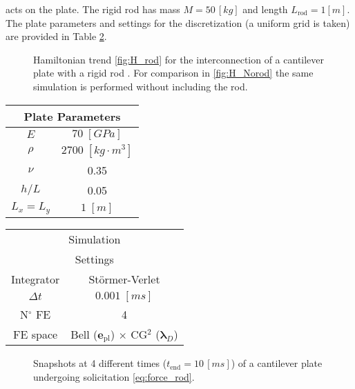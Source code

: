 \documentclass[letterpaper, 10 pt, conference]{ieeeconf}
\begin{document}
acts on the plate. The rigid rod has mass $M = 50 \, [kg]$ and length $L_{\text{rod}} = 1 [m]$. The plate parameters and settings for the discretization (a uniform grid is taken) are provided in Table \ref{tab:par}. 
\begin{figure}[t]
\centering
{}
\hfil
{}
\caption{Hamiltonian trend \ref{fig:H_rod} for the interconnection of a cantilever plate with a rigid rod . For comparison in \ref{fig:H_Norod} the same simulation is performed without including the rod.}
\label{fig:HamInt}
\end{figure}
\begin{table}[t]
	\centering
	\begin{tabular}{|c|c|}
		\hline 
		\multicolumn{2}{|c|}{Plate Parameters} \\ 
		\hline 
		$E$ & $70\; [GPa]$ \\ 
		$\rho$ & $2700\; [kg \cdot m^3]$ \\ 
		$\nu$& 0.35 \\ 
		$h/L$& 0.05 \\ 
		$L_x = L_y$& $1\; [m]$\\ 
		\hline 
	\end{tabular} 
	\begin{tabular}{|c|c|}
		\hline 
		\multicolumn{2}{|c|}{Simulation} \\ 
		\multicolumn{2}{|c|}{Settings} \\
		\hline 
		Integrator & St\"ormer-Verlet \\
		$\Delta t $ & $0.001 \; [ms]$ \\  
		N$^\circ$ FE & 4 \\
		FE space & Bell ($\bm{e}_{\text{pl}}$) $\times$ CG$^2$ ($\bm{\lambda}_D$)\\
		\hline 
	\end{tabular} 
	\captionsetup{width=0.95\linewidth}
	\vspace{1mm}
	\label{tab:par}
\end{table}

\begin{figure}[t]
	\centering
	\hfil
	\caption{Snapshots at 4 different times ($t_{\text{end}} = 10 \,[ms]$) of a cantilever plate undergoing solicitation \eqref{eq:force_rod}.}
	\label{fig:IntNoRod}
\end{figure}
\end{document}
